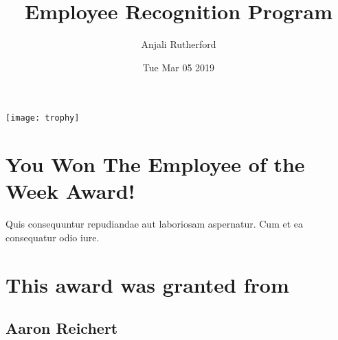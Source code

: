\documentclass[12pt, letterpaper]{article}
\title{Employee Recognition Program}
\author{Anjali Rutherford}
\date{Tue Mar 05 2019}
\begin{document}
\maketitle
\begin{center}
\texttt{[image: trophy]}
\section*{You Won The Employee of the Week Award!}
Quis consequuntur repudiandae aut laboriosam aspernatur. Cum et ea consequatur odio iure.
\section*{This award was granted from}
\subsection*{Aaron Reichert}
\end{center}
\end{document}
